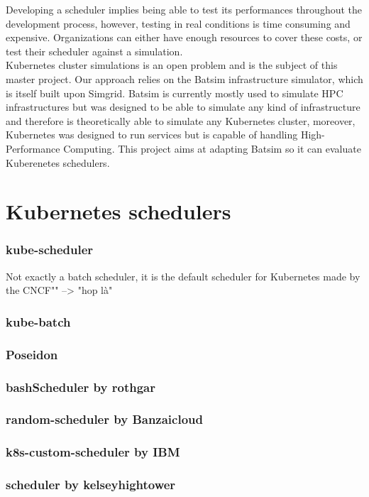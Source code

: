\documentclass[12pt, a4paper]{memoir}
\begin{document}
Developing a scheduler implies being able to test its performances throughout
the development process, however, testing in real conditions is time consuming
and expensive.  Organizations can either have enough resources to cover these
costs, or test their scheduler against a simulation.\\

Kubernetes cluster simulations is an open problem and is the subject of this
master project. Our approach relies on the Batsim\cite{batsim} infrastructure
simulator, which is itself built upon Simgrid\cite{simgrid}. Batsim is
currently mostly used to simulate HPC infrastructures but was designed to be
able to simulate any kind of infrastructure and therefore is theoretically able
to simulate any Kubernetes cluster, moreover, Kubernetes was designed to run
services but is capable of handling High-Performance
Computing\cite{kube-for-hpc}. This project aims at adapting Batsim so it can
evaluate Kuberenetes schedulers.

\section{Kubernetes schedulers}

\subsubsection{kube-scheduler}
Not exactly a batch scheduler, it is the default scheduler for Kubernetes made
by the CNCF"" --> "hop là"
\subsubsection{kube-batch}
\subsubsection{Poseidon}
\subsubsection{bashScheduler by rothgar}
\subsubsection{random-scheduler by Banzaicloud}
\subsubsection{k8s-custom-scheduler by IBM}
\subsubsection{scheduler by kelseyhightower}
\end{document}
